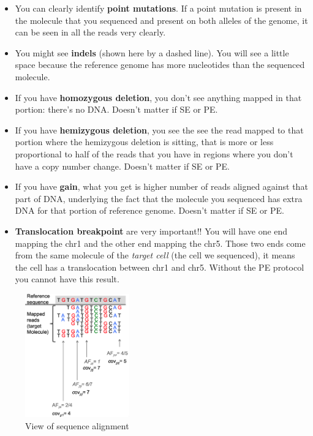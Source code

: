 \begin{itemize}
  
  \item You can clearly identify \textbf{point mutations}. If a point mutation
  is present in the molecule that you sequenced and present on both alleles of
  the genome, it can be seen in all the reads very clearly.
  
  \item You might see \textbf{indels} (shown here by a dashed line). You will
  see a little space because the reference genome has more nucleotides than the
  sequenced molecule.
  
  \item If you have \textbf{homozygous deletion}, you don't see anything mapped
  in that portion: there's no DNA. Doesn't matter if SE or PE.
  
  \item If you have \textbf{hemizygous deletion}, you see the see the read
  mapped to that portion where the hemizygous deletion is sitting, that is more
  or less proportional to half of the reads that you have in regions where you
  don't have a copy number change. Doesn't matter if SE or PE.
  
  \item If you have \textbf{gain}, what you get is higher number of reads
  aligned against that part of DNA, underlying the fact that the molecule you
  sequenced has extra DNA for that portion of reference genome. Doesn't matter
  if SE or PE.

  \item \textbf{Translocation breakpoint} are very important!! You will have one
  end mapping the chr1 and the other end mapping the chr5. Those two ends come
  from the same molecule of the \emph{target cell} (the cell we sequenced), it
  means the cell has a translocation between chr1 and chr5. Without the PE
  protocol you cannot have this result.
  
\end{itemize}

\begin{figure}[H]
  \includegraphics[width=0.4\textwidth]{image14.png}
  \centering
  \caption{View of sequence alignment} \label{fig: coverage and allele
  frequency}
\end{figure}


